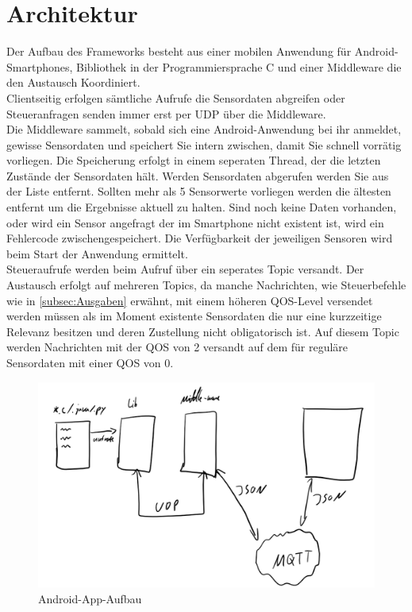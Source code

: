 \documentclass[11pt,a4paper]{report}
\begin{document}
\chapter{Architektur} \label{chap:architektur}
Der Aufbau des Frameworks besteht aus einer mobilen Anwendung für Android-Smartphones, Bibliothek in der Programmiersprache C und einer Middleware die den Austausch Koordiniert.
\\
Clientseitig erfolgen sämtliche Aufrufe die Sensordaten abgreifen oder Steueranfragen senden immer erst per UDP über die Middleware.
\\
Die Middleware sammelt, sobald sich eine Android-Anwendung bei ihr anmeldet, gewisse Sensordaten und speichert Sie intern zwischen, damit Sie schnell vorrätig vorliegen.
Die Speicherung erfolgt in einem seperaten Thread, der die letzten Zustände der Sensordaten hält.
Werden Sensordaten abgerufen werden Sie aus der Liste entfernt.
Sollten mehr als 5 Sensorwerte vorliegen werden die ältesten entfernt um die Ergebnisse aktuell zu halten.
Sind noch keine Daten vorhanden, oder wird ein Sensor angefragt der im Smartphone nicht existent ist, wird ein Fehlercode zwischengespeichert.
Die Verfügbarkeit der jeweiligen Sensoren wird beim Start der Anwendung ermittelt.
\\
Steueraufrufe werden beim Aufruf über ein seperates Topic versandt.
Der Austausch erfolgt auf mehreren Topics, da manche Nachrichten, wie Steuerbefehle wie in \ref{subsec:Ausgaben} erwähnt, mit einem höheren QOS-Level versendet werden müssen als im Moment existente Sensordaten die nur eine kurzzeitige Relevanz besitzen und deren Zustellung nicht obligatorisch ist.
Auf diesem Topic werden Nachrichten mit der QOS von 2 versandt auf dem für reguläre Sensordaten mit einer QOS von 0.
\begin{figure}[htbp]
  \centering
  \includegraphics[width=.9\textwidth]{images/design.png}
  \caption{Android-App-Aufbau}
  \label{fig:design}
\end{figure}
\end{document}
